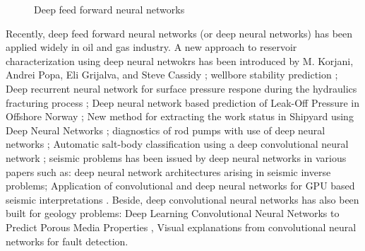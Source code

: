 \documentclass[english]{article}
\def\layersep{2.5cm}
\begin{document}
\begin{figure}[H]
\caption{Deep feed forward neural networks}
\end{figure}
Recently, deep feed forward neural networks (or deep neural networks) has been applied widely in oil and gas industry. A new approach to reservoir characterization using deep neural netwokrs has been introduced by M. Korjani, Andrei Popa, Eli Grijalva, and Steve Cassidy \cite{example1}; wellbore stability prediction \cite{example2}; Deep recurrent neural network for surface pressure respone during the hydraulics fracturing process \cite{example3}; Deep neural network based prediction of Leak-Off Pressure in Offshore Norway \cite{example4}; New method for extracting the work status in Shipyard using Deep Neural Networks \cite{example5}; diagnostics of rod pumps with use of deep neural networks \cite{example7}; Automatic salt-body classification using a deep convolutional neural network \cite{example8}; seismic problems has been issued by deep neural networks in various papers such as: deep neural network architectures arising in seismic inverse problems\cite{example6}; Application of convolutional and deep neural networks for GPU based seismic interpretations \cite{example9}. Beside, deep convolutional neural networks has also been built for geology problems: Deep Learning Convolutional Neural Networks to Predict Porous Media Properties \cite{example10}, Visual explanations from convolutional neural networks for fault detection\cite{example11}.

\end{document}
